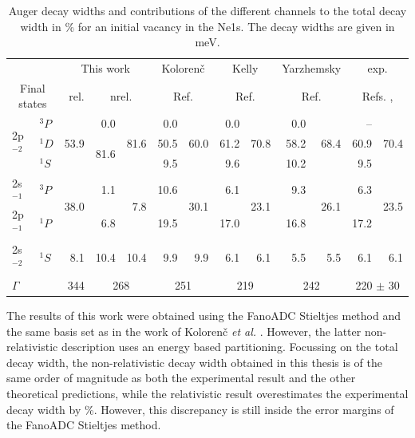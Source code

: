 \begin{table}[h]
  \centering
  \caption{Auger decay widths and contributions of the different channels to
           the total decay width in \% 
           for an initial vacancy in the Ne1s. The decay widths are given in
           \unit[]{meV}.}
  \small
  \begin{tabular}{llr|rr|rr|rr|rr|rr}
   \toprule
    & & \multicolumn{3}{c}{This work} & \multicolumn{2}{c}{Koloren\v{c}} & \multicolumn{2}{c}{Kelly} & \multicolumn{2}{c}{Yarzhemsky} & \multicolumn{2}{c}{exp.}\\
   \multicolumn{2}{c}{Final states} & {rel.} & \multicolumn{2}{c|}{nrel.} & \multicolumn{2}{c|}{Ref.\cite{Kolorenc11}} & \multicolumn{2}{c|}{Ref.\cite{Kelly75}} & \multicolumn{2}{c|}{Ref.\cite{Yarzhemsky02}} & \multicolumn{2}{c}{Refs. \cite{Albiez90}, \cite{Avaldi95}}\\
   \midrule
   \multirow{3}{*}{2p$^{-2}$} & $^3P$   & \multirow{3}{*}{53.9} & 0.0 & \multirow{3}{*}{81.6} &  0.0 & \multirow{3}{*}{60.0} &  0.0 & \multirow{3}{*}{70.8} &  0.0 & \multirow{3}{*}{68.4} &  --  & \multirow{3}{*}{70.4}\\
                              & $^1D$      & & \multirow{2}{*}{81.6} & & 50.5 & & 61.2 & & 58.2 & & 60.9&\\
                              & $^1S$      & &  & &  9.5 & &  9.6 & & 10.2 & &  9.5&\\
   \midrule
 \multirow{2}{*}{2s$^{-1}$2p$^{-1}$} & $^3P$     & \multirow{2}{*}{38.0} & 1.1 & \multirow{2}{*}{7.8} & 10.6 & \multirow{2}{*}{30.1} &  6.1 & \multirow{2}{*}{23.1} &  9.3 & \multirow{2}{*}{26.1} &  6.3 & \multirow{2}{*}{23.5}\\
                              & $^1P$ &       &  6.8 & & 19.5 & & 17.0 & & 16.8 & & 17.2&\\
   \midrule
      2s$^{-2}$               & $^1S$ &       8.1 & 10.4 & 10.4 &  9.9 & 9.9 &  6.1 & 6.1 &  5.5 & 5.5 &  6.1& 6.1\\
   \midrule
   $\Gamma$  & & {344}  & \multicolumn{2}{c|}{268} & \multicolumn{2}{c|}{251} & \multicolumn{2}{c|}{219} & \multicolumn{2}{c|}{242} & \multicolumn{2}{c}{220 $\pm$ 30}\\
   \bottomrule
  \end{tabular}
  \label{table:Ne_gammas}
\end{table}

The results of this work were obtained using the FanoADC Stieltjes method and
the same basis set as in the work of  Koloren\v{c} \textit{et al.}
\cite{Kolorenc11}. However, the latter non-relativistic description uses an
energy based partitioning.
Focussing on the total decay width, the non-relativistic decay width
obtained in this thesis is of the same order of magnitude
as both the experimental result
and the other theoretical predictions, while the relativistic result
overestimates the experimental decay width by \unit[56]{\%}. However, this
discrepancy is still inside the error margins of the FanoADC Stieltjes method.

